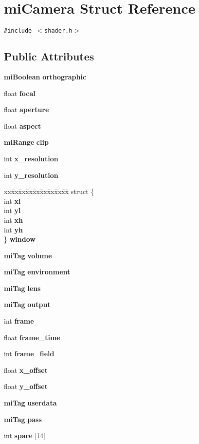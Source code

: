 \section{mi\-Camera Struct Reference}
\label{structmiCamera}
{\tt \#include $<$shader.h$>$}

\subsection*{Public Attributes}
\begin{CompactItemize}
\item 
{\bf mi\-Boolean} {\bf orthographic}
\item 
float {\bf focal}
\item 
float {\bf aperture}
\item 
float {\bf aspect}
\item 
{\bf mi\-Range} {\bf clip}
\item 
int {\bf x\_\-resolution}
\item 
int {\bf y\_\-resolution}
\item 
\begin{tabbing}
xx\=xx\=xx\=xx\=xx\=xx\=xx\=xx\=xx\=\kill
struct \{\\
\>int {\bf xl}\\
\>int {\bf yl}\\
\>int {\bf xh}\\
\>int {\bf yh}\\
\} {\bf window}\\

\end{tabbing}\item 
{\bf mi\-Tag} {\bf volume}
\item 
{\bf mi\-Tag} {\bf environment}
\item 
{\bf mi\-Tag} {\bf lens}
\item 
{\bf mi\-Tag} {\bf output}
\item 
int {\bf frame}
\item 
float {\bf frame\_\-time}
\item 
int {\bf frame\_\-field}
\item 
float {\bf x\_\-offset}
\item 
float {\bf y\_\-offset}
\item 
{\bf mi\-Tag} {\bf userdata}
\item 
{\bf mi\-Tag} {\bf pass}
\item 
int {\bf spare} [14]
\end{CompactItemize}


